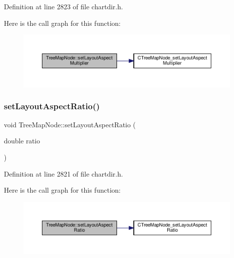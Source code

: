 Definition at line 2823 of file chartdir.\+h.

Here is the call graph for this function\+:
\nopagebreak
\begin{figure}[H]
\begin{center}
\leavevmode
\includegraphics[width=350pt]{class_tree_map_node_a7722b40c9891945d11110f2a9122c029_cgraph}
\end{center}
\end{figure}
\mbox{\label{class_tree_map_node_a2351ae24b11c4a590090ee607c302c4f}} 
\subsubsection{\texorpdfstring{set\+Layout\+Aspect\+Ratio()}{setLayoutAspectRatio()}}
{\footnotesize\ttfamily void Tree\+Map\+Node\+::set\+Layout\+Aspect\+Ratio (\begin{DoxyParamCaption}\item[{double}]{ratio }\end{DoxyParamCaption})\hspace{0.3cm}{\ttfamily [inline]}}



Definition at line 2821 of file chartdir.\+h.

Here is the call graph for this function\+:
\nopagebreak
\begin{figure}[H]
\begin{center}
\leavevmode
\includegraphics[width=350pt]{class_tree_map_node_a2351ae24b11c4a590090ee607c302c4f_cgraph}
\end{center}
\end{figure}
\mbox{\label{class_tree_map_node_a658ae0fc093692e501c1d6a4a18c7c74}} 

